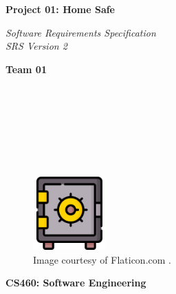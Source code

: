 \documentclass{article}
\begin{document}
\begin{titlepage}
\begin{center}
\vspace*{1cm}

\Huge
\textbf{Project 01: Home Safe}

\vspace{0.5cm}
\Large
\textit{Software Requirements Specification} \\
\textit{SRS Version 2}

\vspace{1cm}

\textbf{Team 01}

\vspace{0.5cm}

 \\
 \\
 \\
 \\
 \\
 \\

\vspace{1cm}

\begin{figure}[h]
    \centering
    \includegraphics[width=0.25\textwidth]{docs/figs/safe.png}
    \caption*{Image courtesy of Flaticon.com \cite{flaticonSafeDeposit}.}
    \label{fig:safeIcon}
\end{figure}

\vspace{7cm}

\Large
\textbf{CS460: Software Engineering} \\

\end{center}
\end{titlepage}

\newpage

\tableofcontents

\newpage
\end{document}
